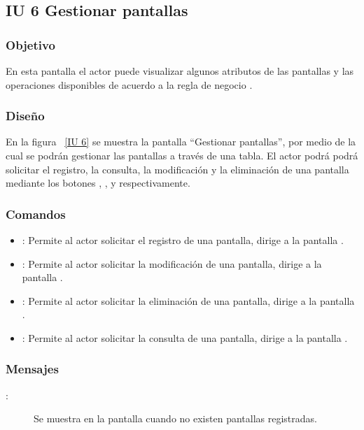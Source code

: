 \subsection{IU 6 Gestionar pantallas}
\subsubsection{Objetivo}
	
	En esta pantalla el actor puede visualizar algunos atributos de las pantallas y las operaciones disponibles de acuerdo a la regla de negocio .

\subsubsection{Diseño}

    En la figura ~\ref{IU 6} se muestra la pantalla ``Gestionar pantallas'', por medio de la cual 
    se podrán gestionar las pantallas a través de una tabla.
    El actor podrá podrá solicitar el registro, la consulta, la modificación y la eliminación de una pantalla mediante los botones
    , \btnConsulta, \btnEditar y \btnEliminar respectivamente. \\




\subsubsection{Comandos}
\begin{itemize}
	\item {}: Permite al actor solicitar el registro de una pantalla, dirige a la pantalla .
	\item \btnEditar[Modificar]: Permite al actor solicitar la modificación de una pantalla, dirige a la pantalla .
	\item \btnEliminar[Eliminar]: Permite al actor solicitar la eliminación de una pantalla, dirige a la pantalla .
	\item \btnConsulta[Consultar]: Permite al actor solicitar la consulta de una pantalla, dirige a la pantalla .
\end{itemize}

\subsubsection{Mensajes}

	
\begin{description}
	\item[:] Se muestra en la pantalla  cuando no existen pantallas registradas.
\end{description}
